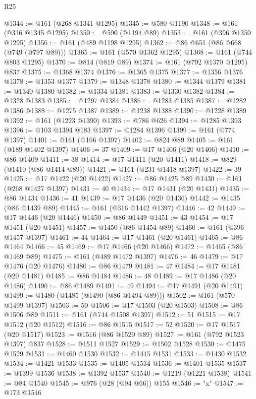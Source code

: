 \begin{lexlean}{R25}
\begin{coremodule}
@1344 := @161 (@268 @1341 @1295)
@1345 := @580 @1190
@1348 := @161 (@316 @1345 @1295)
@1350 := @590 (@1194 @89)
@1353 := @161 (@396 @1350 @1295)
@1356 := @161 (@489 @1198 @1295)
@1362 := @86 @651 (@86 @668 (@749 (@797 @89)))
@1365 := @161 (@570 @1362 @1295)
@1368 := @161 (@744 @803 @1295)
@1370 := @814 (@819 @89)
@1374 := @161 (@792 @1370 @1295) @837
@1375 := @1368 @1374
@1376 := @1365 @1375
@1377 := @1356 @1376
@1378 := @1353 @1377
@1379 := @1348 @1378
@1380 := @1344 @1379
@1381 := @1340 @1380
@1382 := @1334 @1381
@1383 := @1330 @1382
@1384 := @1328 @1383
@1385 := @1297 @1384
@1386 := @1283 @1385
@1387 := @1282 @1386
@1388 := @1275 @1387
@1389 := @1238 @1388
@1390 := @1228 @1389
@1392 := @161 (@1223 @1390)
@1393 := @786 @626
@1394 := @1285 @1393
@1396 := @103 @1394 @183
@1397 := @1284 @1396
@1399 := @161 (@774 @1397)
@1401 := @161 (@166 @1397)
@1402 := @824 @89
@1405 := @161 (@189 @1402 @1397)
@1406 := 37
@1409 := @17 @1406 (@20 @1406)
@1410 := @86 @1409
@1411 := 38
@1414 := @17 @1411 (@20 @1411)
@1418 := @829 (@1410 (@86 @1414 @89))
@1421 := @161 (@231 @1418 @1397)
@1422 := 39
@1425 := @17 @1422 (@20 @1422)
@1427 := @86 @1425 @89
@1430 := @161 (@268 @1427 @1397)
@1431 := 40
@1434 := @17 @1431 (@20 @1431)
@1435 := @86 @1434
@1436 := 41
@1439 := @17 @1436 (@20 @1436)
@1442 := @1435 (@86 @1439 @89)
@1445 := @161 (@316 @1442 @1397)
@1446 := 42
@1449 := @17 @1446 (@20 @1446)
@1450 := @86 @1449
@1451 := 43
@1454 := @17 @1451 (@20 @1451)
@1457 := @1450 (@86 @1454 @89)
@1460 := @161 (@396 @1457 @1397)
@1461 := 44
@1464 := @17 @1461 (@20 @1461)
@1465 := @86 @1464
@1466 := 45
@1469 := @17 @1466 (@20 @1466)
@1472 := @1465 (@86 @1469 @89)
@1475 := @161 (@489 @1472 @1397)
@1476 := 46
@1479 := @17 @1476 (@20 @1476)
@1480 := @86 @1479
@1481 := 47
@1484 := @17 @1481 (@20 @1481)
@1485 := @86 @1484
@1486 := 48
@1489 := @17 @1486 (@20 @1486)
@1490 := @86 @1489
@1491 := 49
@1494 := @17 @1491 (@20 @1491)
@1499 := @1480 (@1485 (@1490 (@86 @1494 @89)))
@1502 := @161 (@570 @1499 @1397)
@1503 := 50
@1506 := @17 @1503 (@20 @1503)
@1508 := @86 @1506 @89
@1511 := @161 (@744 @1508 @1397)
@1512 := 51
@1515 := @17 @1512 (@20 @1512)
@1516 := @86 @1515
@1517 := 52
@1520 := @17 @1517 (@20 @1517)
@1523 := @1516 (@86 @1520 @89)
@1527 := @161 (@792 @1523 @1397) @837
@1528 := @1511 @1527
@1529 := @1502 @1528
@1530 := @1475 @1529
@1531 := @1460 @1530
@1532 := @1445 @1531
@1533 := @1430 @1532
@1534 := @1421 @1533
@1535 := @1405 @1534
@1536 := @1401 @1535
@1537 := @1399 @1536
@1538 := @1392 @1537
@1540 := @1219 (@1221 @1538)
@1541 := @84 @1540
@1545 := @976 (@28 (@94 @66)) @155
@1546 := "x"
@1547 := @173 @1546

\end{coremodule}
\end{lexlean}
